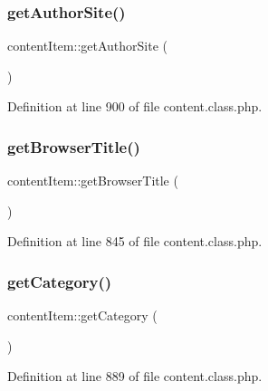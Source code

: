 \mbox{\label{classcontentItem_ac8050edaeafe9d6a9c3017185a60576d}} 
\subsubsection{\texorpdfstring{get\+Author\+Site()}{getAuthorSite()}}
{\footnotesize\ttfamily content\+Item\+::get\+Author\+Site (\begin{DoxyParamCaption}{ }\end{DoxyParamCaption})}



Definition at line 900 of file content.\+class.\+php.

\mbox{\label{classcontentItem_a1590559deb019ba22a637cf78408f242}} 
\subsubsection{\texorpdfstring{get\+Browser\+Title()}{getBrowserTitle()}}
{\footnotesize\ttfamily content\+Item\+::get\+Browser\+Title (\begin{DoxyParamCaption}{ }\end{DoxyParamCaption})}



Definition at line 845 of file content.\+class.\+php.

\mbox{\label{classcontentItem_ae5a4e97f8f472805fff31340bc095ff3}} 
\subsubsection{\texorpdfstring{get\+Category()}{getCategory()}}
{\footnotesize\ttfamily content\+Item\+::get\+Category (\begin{DoxyParamCaption}{ }\end{DoxyParamCaption})}



Definition at line 889 of file content.\+class.\+php.

